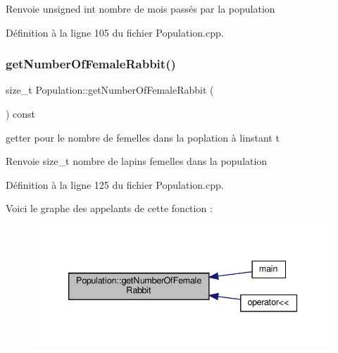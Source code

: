 \begin{DoxyReturn}{Renvoie}
unsigned int nombre de mois passés par la population 
\end{DoxyReturn}


Définition à la ligne 105 du fichier Population.\+cpp.

\mbox{\label{classPopulation_a13d2cee6f6bf940eea261b61c5999e1f}} 
\subsubsection{\texorpdfstring{get\+Number\+Of\+Female\+Rabbit()}{getNumberOfFemaleRabbit()}}
{\footnotesize\ttfamily size\+\_\+t Population\+::get\+Number\+Of\+Female\+Rabbit (\begin{DoxyParamCaption}{ }\end{DoxyParamCaption}) const}



getter pour le nombre de femelles dans la poplation à l\textquotesingle{}instant t 

\begin{DoxyReturn}{Renvoie}
size\+\_\+t nombre de lapins femelles dans la population 
\end{DoxyReturn}


Définition à la ligne 125 du fichier Population.\+cpp.

Voici le graphe des appelants de cette fonction \+:
\nopagebreak
\begin{figure}[H]
\begin{center}
\leavevmode
\includegraphics[width=339pt]{classPopulation_a13d2cee6f6bf940eea261b61c5999e1f_icgraph}
\end{center}
\end{figure}
\mbox{\label{classPopulation_a74dc9a5e829548a16d7910d7c17bb751}} 
